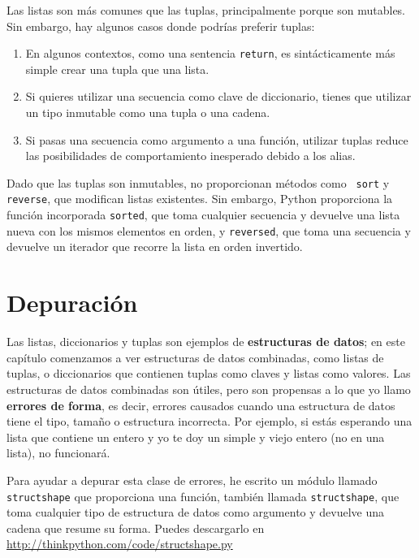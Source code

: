 \documentclass[10pt]{book}
\begin{document}
Las listas son más comunes que las tuplas, principalmente porque son mutables.
Sin embargo, hay algunos casos donde podrías preferir tuplas:

\begin{enumerate}

\item En algunos contextos, como una sentencia {\tt return}, es
sintácticamente más simple crear una tupla que una lista.

\item Si quieres utilizar una secuencia como clave de diccionario,
tienes que utilizar un tipo inmutable como una tupla o una cadena.

\item Si pasas una secuencia como argumento a una función,
utilizar tuplas reduce las posibilidades de comportamiento inesperado
debido a los alias.

\end{enumerate}

Dado que las tuplas son inmutables, no proporcionan métodos como {\tt
  sort} y {\tt reverse}, que modifican listas existentes.  Sin embargo, Python
proporciona la función incorporada {\tt sorted}, que toma cualquier secuencia
y devuelve una lista nueva con los mismos elementos en orden, y
{\tt reversed}, que toma una secuencia y devuelve un iterador que
recorre la lista en orden invertido.
 


\section{Depuración}

Las listas, diccionarios y tuplas son ejemplos de {\bf estructuras
  de datos}; en este capítulo comenzamos a ver estructuras de datos
combinadas, como listas de tuplas, o diccionarios que contienen tuplas
como claves y listas como valores.  Las estructuras de datos combinadas son útiles,
pero son propensas a lo que yo llamo {\bf errores de forma}, es decir, errores
causados cuando una estructura de datos tiene el tipo, tamaño o estructura
incorrecta. Por ejemplo, si estás esperando una lista que contiene un entero y yo
te doy un simple y viejo entero (no en una lista), no funcionará.

Para ayudar a depurar esta clase de errores, he escrito un módulo
llamado {\tt structshape} que proporciona una función, también llamada
{\tt structshape}, que toma cualquier tipo de estructura de datos como
argumento y devuelve una cadena que resume su forma.
Puedes descargarlo en \url{http://thinkpython.com/code/structshape.py}
\end{document}
